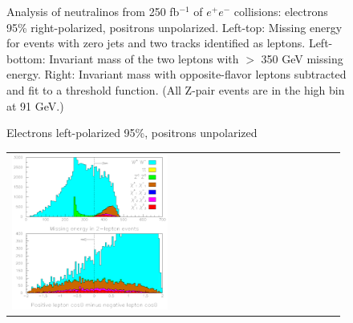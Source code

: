 \documentclass[12pt]{article}
\begin{document}
\begin{figure}[t]
\begin{center}
\begin{tabular}{p{0.49\linewidth} p{0.49\linewidth}}
    \end{tabular}

    \caption{Analysis of neutralinos from 250 fb$^{-1}$ of $e^+e^-$
    collisions: electrons 95\% right-polarized, positrons unpolarized.
    Left-top: Missing energy for events with zero jets and two tracks
    identified as leptons.  Left-bottom: Invariant mass of the two
    leptons with $>$ 350 GeV missing energy.  Right: Invariant mass
    with opposite-flavor leptons subtracted and fit to a threshold
    function.  (All Z-pair events are in the high bin at 91 GeV.)}

    \label{jimptwoleptons}
  \end{center}
\end{figure}

\begin{figure}[t]
  \begin{center}
    Electrons left-polarized 95\%, positrons unpolarized
    \begin{tabular}{p{0.49\linewidth} p{0.49\linewidth}}
      \begin{minipage}{\linewidth} \includegraphics[width=\linewidth]{jimpleftleptons_a} \end{minipage} &

\end{tabular}
\end{center}
\end{figure}
\end{document}
